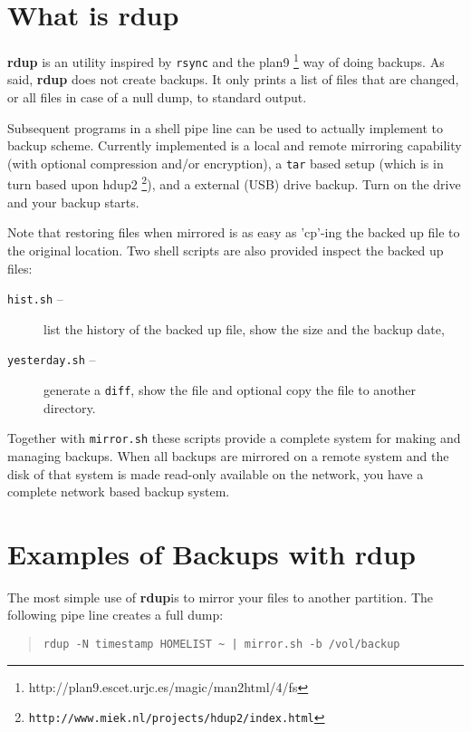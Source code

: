 \documentclass{article}
\newcommand{\rdup}{\textbf{rdup}}
\newcommand{\cmd}[1]{\texttt{#1}}
\newcommand{\url}[1]{\texttt{#1}}
\begin{document}
\section*{What is \rdup}
\rdup{} is an utility inspired by \cmd{rsync} and the 
plan9 \footnote{http://plan9.escet.urjc.es/magic/man2html/4/fs} 
way of doing backups. As said, \rdup{} does not create backups. It only
prints a list of files that are changed, or all files in case of a null
dump, to standard output.

Subsequent programs in a shell pipe line can be used to actually
implement to backup scheme. Currently implemented is a local and
remote mirroring capability (with optional compression and/or
encryption), a \cmd{tar} based setup (which is in turn based upon
hdup2 \footnote{\url{http://www.miek.nl/projects/hdup2/index.html}}), 
and a external (USB) drive backup. Turn on the drive and your backup starts.

Note that restoring files when mirrored is as easy as 'cp'-ing the
backed up file to the original location. Two shell scripts are
also provided inspect the backed up files:
\begin{description}
        \item[\cmd{hist.sh} --]{
                list the history of the backed up file, show the size
                and the backup date,}
        \item[\cmd{yesterday.sh} --]{
                generate a \cmd{diff}, show the file and optional copy 
                the file to another directory.}
\end{description}

Together with \cmd{mirror.sh} these scripts provide a complete system
for making and managing backups. When all backups are mirrored on a
remote system and the disk of that system is made read-only available on 
the network, you have a complete network based backup system.

\section*{Examples of Backups with rdup}
The most simple use of \rdup is to mirror your files to
another partition. The following pipe line creates a
full dump:
\begin{quote}
\begin{verbatim}
rdup -N timestamp HOMELIST ~ | mirror.sh -b /vol/backup
\end{verbatim}
\end{quote}
\end{document}
